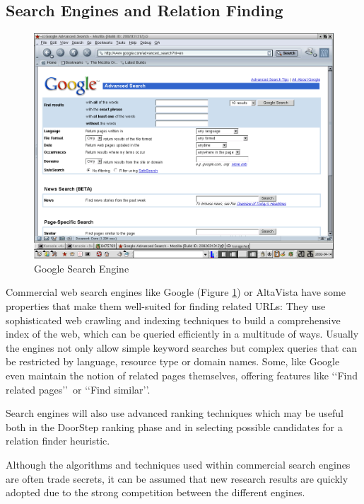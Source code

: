 \documentclass[a4paper,twoside]{danarticle}
\theoremstyle{remark}
\begin{document}
     \subsection{Search Engines and Relation Finding}
       \begin{figure}[ht]
         \centering
         \includegraphics[width=12cm]{googleadv}
         \caption{Google Search Engine}
         \label{googleadv}
       \end{figure}
       Commercial web search engines like Google\cite{google} (Figure \ref{googleadv})
       or AltaVista\cite{altavista} have 
       some properties that make them well-suited for finding related URLs: They 
       use sophisticated web crawling and indexing techniques to build a 
       comprehensive index of the web, which can be queried efficiently in 
       a multitude of ways. Usually the engines not only allow simple keyword 
       searches but complex queries that can be restricted by language, 
       resource type or domain names. Some, like Google\cite{google} 
       even maintain the notion of related pages themselves, offering features like 
       \lq\lq Find related pages\rq\rq\ or \lq\lq Find similar\rq\rq . 
  
       Search engines will also use advanced ranking techniques which may be
       useful both in the DoorStep ranking phase and in selecting possible
       candidates for a relation finder heuristic.
       
       Although the algorithms and techniques used within commercial search 
       engines are often trade secrets, it can be assumed 
       that new research results are quickly adopted due to the strong 
       competition between the different engines.
       
\end{document}
